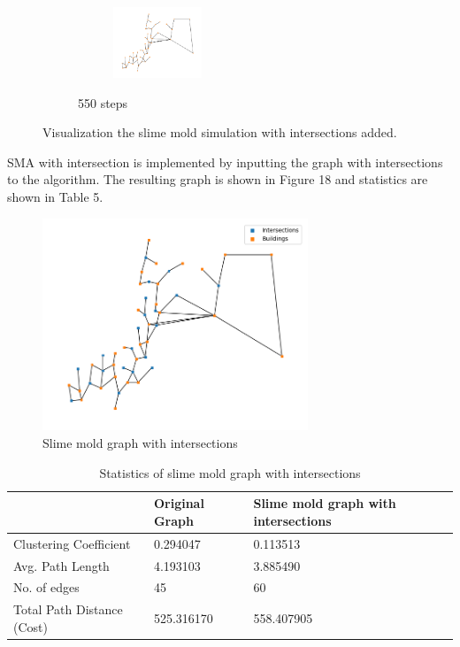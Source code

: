 \documentclass[11pt]{article}
\begin{document}
\begin{figure}[H]
\begin{subfigure}{0.24\textwidth}
	\begin{subfigure}{0.24\textwidth}
	    \centering
	    \hspace*{-1cm}
	    \includegraphics[width=100px]{550g.png}
	\end{subfigure}
        \caption{550 steps}
    \end{subfigure}
    \caption{Visualization the slime mold simulation with intersections added.}
\end{figure}
SMA with intersection is implemented by inputting the graph with intersections to the algorithm. The resulting graph is shown in Figure 18 and statistics are shown in Table 5. 
\begin{figure}[H]
\centering
\includegraphics[width=300px]{smainter.png}
\caption{Slime mold graph with intersections}
\end{figure}
\begin{table}[H]
\centering
\begin{tabular}{|l|l|l|}
\hline
                           & Original Graph & Slime mold graph with intersections \\ \hline
Clustering Coefficient     & 0.294047       & 0.113513                            \\ \hline
Avg. Path Length           & 4.193103       & 3.885490                            \\ \hline
No. of edges               & 45             & 60                                  \\ \hline
Total Path Distance (Cost) & 525.316170     & 558.407905                          \\ \hline
\end{tabular}
\caption{Statistics of slime mold graph with intersections}
\end{table}
\end{document}
